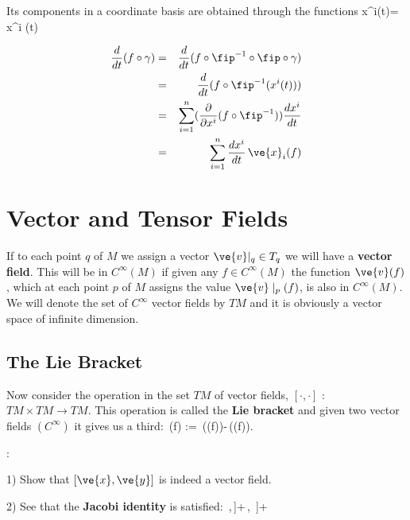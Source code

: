 Its components in a coordinate basis are obtained through the functions
\beq
x^i(t)= x^i \circ \fip\circ\gamma(t)
\eeq

\begin{eqnarray}
\frac d{dt}(f\circ\gamma) &=& 
\frac d{dt}(f\circ\fip^{-1}\circ \fip \circ \gamma) \nonumber \\
 &=& \frac d{dt}(f\circ\fip^{-1}(x^i(t))) \nonumber \\
 &=& \sum_{i=1}^n (\frac{\partial}{\partial x^i}(f\circ\fip^{-1}))\frac{dx^i}{ dt} \nonumber \\
 &=& \sum_{i=1}^n \frac{dx^i}{dt}\,{\ve{ x}}_i(f)
\end{eqnarray}


\section{Vector and Tensor Fields}



If to each point $q$ of $M$ we assign a vector ${\ve{ v}}|_q \in T_q$
we will have a {\bf vector field}. This will be in $C^{\infty}(M)$ if
given any $f\in C^{\infty}(M)$ the function ${\ve{ v}}(f)$, which at each
point $p$ of $M$ assigns the value ${\ve{ v}}\mid_p(f)$, is also in
$C^{\infty}(M)$. We will denote the set of $C^{\infty}$ vector fields by $TM$ and it is obviously a vector space of
infinite dimension.


\subsection{The Lie Bracket}


Now consider the operation in the set $TM$ of
vector fields, $[\cdot,\cdot]$ : $TM\times TM\to TM$. This operation is
called the {\bf Lie bracket} and given two vector fields
$(C^{\infty})$ it gives us a third:
\beq
[\ve{ x},\ve{ y}]\,(f) := \,((f))-\,((f)).
\eeq

\ejer: 

1) Show that $[\ve{ x},\ve{ y}]$ is indeed a
vector field.


2) See that the {\bf Jacobi identity} is satisfied:
\beq
\left[[\ve{ x},\ve{ y}]\,,\,\right]+\left[[\ve{ z},\ve{ x}]\,,
\,\right]+\left[[\ve{ y},\ve{ z}\,,\,\ve{ x}\right]=0
\eeq

